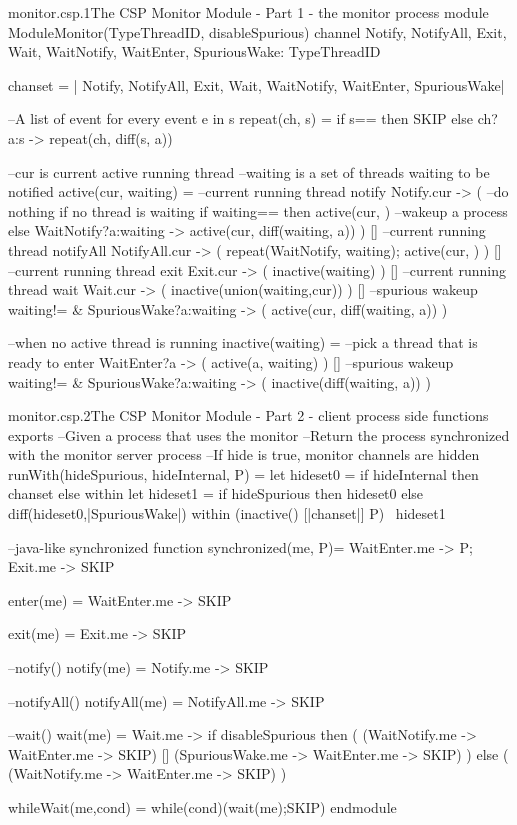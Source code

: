 \documentclass[a4paper, 12pt]{article}
\begin{document}
\begin{cspfloat}{monitor.csp.1}{The CSP Monitor Module - Part 1 - the monitor process}
module ModuleMonitor(TypeThreadID, disableSpurious)
  channel Notify, NotifyAll, Exit, Wait, 
          WaitNotify, WaitEnter, SpuriousWake: TypeThreadID

  chanset = {| Notify, NotifyAll, Exit, Wait, WaitNotify, WaitEnter, SpuriousWake|}

  --A list of event for every event e in s
  repeat(ch, s) = if s=={} then SKIP else ch?a:s -> repeat(ch, diff(s, {a}))

  --cur is current active running thread
  --waiting is a set of threads waiting to be notified
  active(cur, waiting) =
    --current running thread notify
    Notify.cur -> (
      --do nothing if no thread is waiting
      if waiting=={} then active(cur, {})
      --wakeup a process
      else WaitNotify?a:waiting -> 
           active(cur, diff(waiting, {a}))
    ) [] --current running thread notifyAll
    NotifyAll.cur -> (
      repeat(WaitNotify, waiting);
      active(cur, {})
    ) [] --current running thread exit
    Exit.cur -> (
      inactive(waiting)
    ) [] --current running thread wait
    Wait.cur -> (
      inactive(union(waiting,{cur}))
    ) [] --spurious wakeup
    waiting!={} & SpuriousWake?a:waiting -> (
      active(cur, diff(waiting, {a}))
    )

  --when no active thread is running
  inactive(waiting) = 
    --pick a thread that is ready to enter
    WaitEnter?a -> (
      active(a, waiting)
    ) []
    --spurious wakeup
    waiting!={} & SpuriousWake?a:waiting -> (
      inactive(diff(waiting, {a}))
    )
\end{cspfloat}

\begin{cspfloat}{monitor.csp.2}{The CSP Monitor Module - Part 2 - client process side functions}
exports
  --Given a process that uses the monitor
  --Return the process synchronized with the monitor server process
  --If hide is true, monitor channels are hidden
  runWith(hideSpurious, hideInternal, P) = 
    let hideset0 = if hideInternal then chanset else {} within
    let hideset1 = if hideSpurious then hideset0 
                   else diff(hideset0,{|SpuriousWake|}) within
    (inactive({}) [|chanset|] P) \ hideset1
  
  --java-like synchronized function
  synchronized(me, P)= WaitEnter.me -> P; Exit.me -> SKIP

  enter(me) = WaitEnter.me -> SKIP

  exit(me) = Exit.me -> SKIP

  --notify()
  notify(me) = Notify.me -> SKIP

  --notifyAll()
  notifyAll(me) = NotifyAll.me -> SKIP

  --wait()
  wait(me) =
    Wait.me -> 
    if disableSpurious then (
      (WaitNotify.me -> WaitEnter.me -> SKIP)
   [] (SpuriousWake.me -> WaitEnter.me -> SKIP)
  ) else (
      (WaitNotify.me -> WaitEnter.me -> SKIP)
  )
  
  whileWait(me,cond) = while(cond)(wait(me);SKIP)
endmodule
\end{cspfloat}
\end{document}
